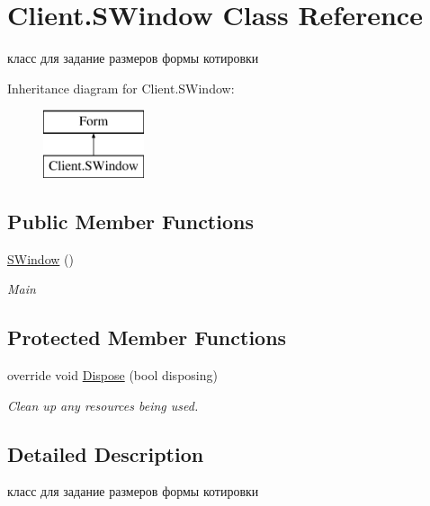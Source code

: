 \hypertarget{class_client_1_1_s_window}{}\section{Client.\+S\+Window Class Reference}
\label{class_client_1_1_s_window}


класс для задание размеров формы котировки  


Inheritance diagram for Client.\+S\+Window\+:\begin{figure}[H]
\begin{center}
\leavevmode
\includegraphics[height=2.000000cm]{class_client_1_1_s_window}
\end{center}
\end{figure}
\subsection*{Public Member Functions}
\begin{DoxyCompactItemize}
\item 
\hyperlink{class_client_1_1_s_window_a7688faaaf1b0ea097066142fc9d90326}{S\+Window} ()
\begin{DoxyCompactList}\small\item\em Main \end{DoxyCompactList}\end{DoxyCompactItemize}
\subsection*{Protected Member Functions}
\begin{DoxyCompactItemize}
\item 
override void \hyperlink{class_client_1_1_s_window_a06a09e3c69c7ed01bf7a96ebbc90c12b}{Dispose} (bool disposing)
\begin{DoxyCompactList}\small\item\em Clean up any resources being used. \end{DoxyCompactList}\end{DoxyCompactItemize}


\subsection{Detailed Description}
класс для задание размеров формы котировки 



